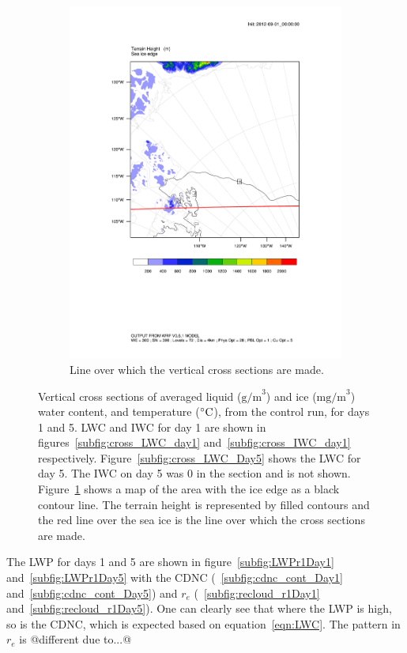 \begin{figure}[ht]
\begin{subfigure}{0.48\textwidth}
        \includegraphics[width=\textwidth]{results/control/crossSec_line.pdf}
        \caption{Line over which the vertical cross sections are made.}
        \label{subfig:cross_line}
    \end{subfigure}
    \caption{Vertical cross sections of averaged liquid ($\text{g/m}^3$) and ice  ($\text{mg/m}^3$) water content, and temperature ($\degree\text{C}$), from the control run, for days 1 and 5. LWC and IWC for day 1 are shown in figures~\ref{subfig:cross_LWC_day1} and~\ref{subfig:cross_IWC_day1} respectively. Figure~\ref{subfig:cross_LWC_Day5} shows the LWC for day 5. The IWC on day 5 was 0 in the section and is not shown. Figure~\ref{subfig:cross_line} shows a map of the area with the ice edge as a black contour line. The terrain height is represented by filled contours and the red line over the sea ice is the line over which the cross sections are made.}
    \label{fig:sections}
\end{figure}

The LWP for days 1 and 5 are shown in figure~\ref{subfig:LWPr1Day1} and~\ref{subfig:LWPr1Day5} with the CDNC (~\ref{subfig:cdnc_cont_Day1} and~\ref{subfig:cdnc_cont_Day5}) and $r_e$ (~\ref{subfig:recloud_r1Day1} and~\ref{subfig:recloud_r1Day5}). One can clearly see that where the LWP is high, so is the CDNC, which is expected based on equation~\ref{eqn:LWC}. The pattern in $r_e$ is @different due to...@

